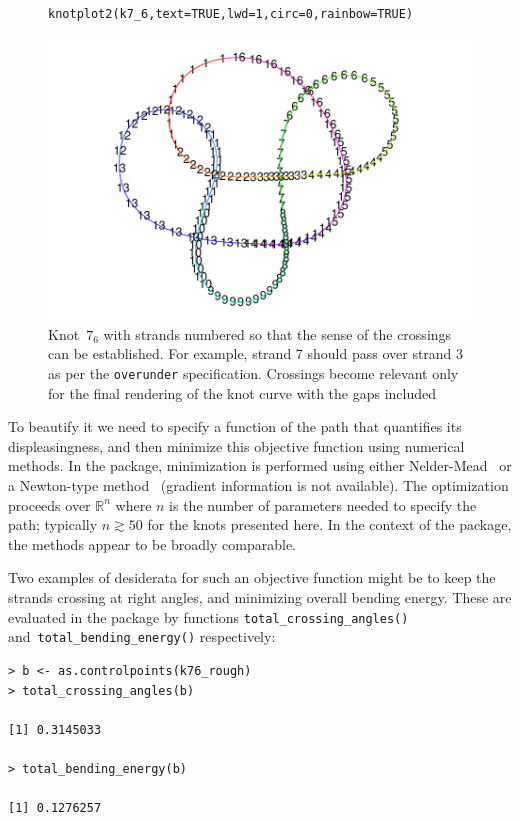 \documentclass{birkjour}
\theoremstyle{definition}
\theoremstyle{remark}
\numberwithin{equation}{section}
\begin{document}
\begin{figure}[!tbp]
\begin{verbatim}
knotplot2(k7_6,text=TRUE,lwd=1,circ=0,rainbow=TRUE)
\end{verbatim}
 \centering
\includegraphics[scale = 0.9]{knot-004}
\caption{Knot~$7_6$ with strands numbered \label{k76_strands} so that
  the sense of the crossings can be established.  For example, strand
  7 should pass over strand 3 as per the {\tt overunder}
  specification.  Crossings become relevant only for the final
  rendering of the knot curve with the gaps included}
\end{figure}

To beautify it we need to specify a function of the path that
quantifies its displeasingness, and then minimize this objective
function using numerical methods.  In the package, minimization is
performed using either Nelder-Mead~\cite{nelder1965} or a Newton-type
method~\cite{dennis1983} (gradient information is not available).  The
optimization proceeds over $\mathbb{R}^n$ where $n$ is the number of
parameters needed to specify the path; typically $n\gtrsim 50$ for the
knots presented here.  In the context of the package, the methods
appear to be broadly comparable.

Two examples of desiderata for such an objective function might be to
keep the strands crossing at right angles, and minimizing overall bending
energy.  These are evaluated in the package by functions
{\tt total\_crossing\_angles()} and~{\tt total\_bending\_energy()}
respectively:

\begin{verbatim}
> b <- as.controlpoints(k76_rough)
> total_crossing_angles(b)

[1] 0.3145033

> total_bending_energy(b)

[1] 0.1276257
\end{verbatim}
\end{document}
